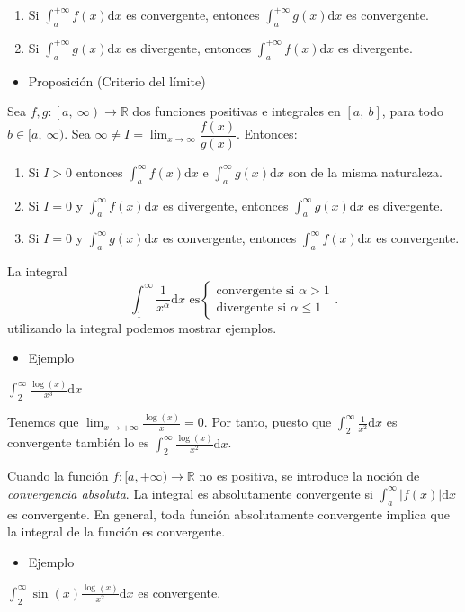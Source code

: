 \begin{enumerate}[label=\arabic*)]
	\item Si $\int_{a}^{+\infty}f(x)\mathrm{d}x$ es convergente, entonces $\int_{a}^{+\infty}g(x)\mathrm{d}x$ es convergente.
	\item Si $\int_{a}^{+\infty}g(x)\mathrm{d}x$ es divergente, entonces $\int_{a}^{+\infty}f(x)\mathrm{d}x$ es divergente.
\end{enumerate}
\begin{itemize}[label=\color{red}\textbullet, leftmargin=*]
	\item \color{lightblue}Proposición (Criterio del límite)
\end{itemize}
Sea $f,g:\left[a,~\infty\right)\rightarrow\mathbb{R}$ dos funciones positivas e integrales en $[a,~b]$, para todo $b\in[a,~\infty)$. Sea $\infty\neq I=\lim_{x\to\infty}\dfrac{f(x)}{g(x)}$. Entonces: 
\begin{enumerate}[label=\arabic*)]
	\item Si $I>0$ entonces $\int_{a}^{\infty}f(x)\mathrm{d}x$ e $\int_{a}^{\infty}g(x)\mathrm{d}x$ son de la misma naturaleza.
	\item Si $I=0$ y $\int_{a}^{\infty}f(x)\mathrm{d}x$ es divergente, entonces $\int_{a}^{\infty}g(x)\mathrm{d}x$ es divergente.
	\item Si $I=0$ y $\int_{a}^{\infty}g(x)\mathrm{d}x$ es convergente, entonces $\int_{a}^{\infty}f(x)\mathrm{d}x$ es convergente.
\end{enumerate}
La integral $$\int_{1}^{\infty}\dfrac{1}{x^\alpha}\mathrm{d}x\text{ es}\left\{
	\begin{array}{l}
		\text{convergente si }\alpha>1\\
		\text{divergente si }\alpha\le1
	\end{array}
\right..$$
utilizando la integral podemos mostrar ejemplos.
\begin{itemize}[label=\color{red}\textbullet, leftmargin=*]
	\item \color{lightblue}Ejemplo
\end{itemize}
$\int_{2}^{\infty}\frac{\log(x)}{x^3}\mathrm{d}x$

Tenemos que $\lim_{x\to+\infty}\frac{\log(x)}{x}=0$. Por tanto, puesto que $\int_{2}^{\infty}\frac{1}{x^2}\mathrm{d}x$ es convergente también lo es $\int_{2}^{\infty}\frac{\log(x)}{x^2}\mathrm{d}x$.

Cuando la función $f:[a,+\infty)\rightarrow\mathbb{R}$ no es positiva, se introduce la noción de \textit{convergencia absoluta}. La integral es absolutamente convergente si $\int_{a}^{\infty}|f(x)|\mathrm{d}x$ es convergente. En general, toda función absolutamente convergente implica que la integral de la función es convergente.
\begin{itemize}[label=\color{red}\textbullet, leftmargin=*]
	\item \color{lightblue}Ejemplo
\end{itemize}
 $\int_{2}^{\infty}\sin(x)\frac{\log(x)}{x^2}\mathrm{d}x$ es convergente.
